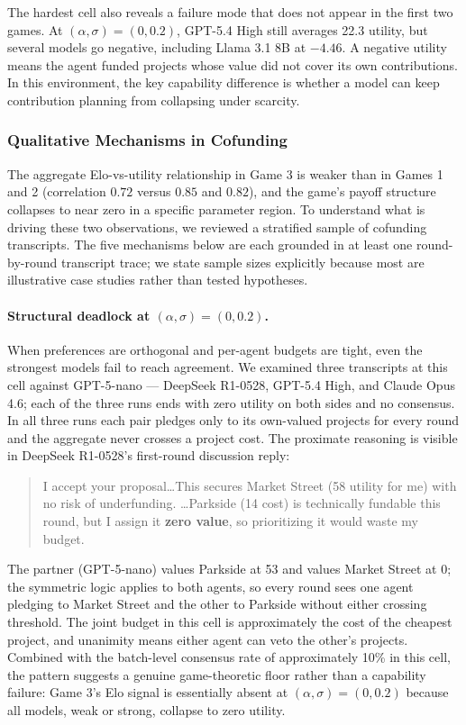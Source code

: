 The hardest cell also reveals a failure mode that does not appear in the first two games. At $(\alpha, \sigma) = (0, 0.2)$, GPT-5.4 High still averages 22.3 utility, but several models go negative, including Llama 3.1 8B at $-4.46$. A negative utility means the agent funded projects whose value did not cover its own contributions. In this environment, the key capability difference is whether a model can keep contribution planning from collapsing under scarcity.

\subsubsection{Qualitative Mechanisms in Cofunding}
\label{sec:game3_qualitative}

The aggregate Elo-vs-utility relationship in Game 3 is weaker than in Games 1 and 2 (correlation $0.72$ versus $0.85$ and $0.82$), and the game's payoff structure collapses to near zero in a specific parameter region. To understand what is driving these two observations, we reviewed a stratified sample of cofunding transcripts. The five mechanisms below are each grounded in at least one round-by-round transcript trace; we state sample sizes explicitly because most are illustrative case studies rather than tested hypotheses.

\paragraph{Structural deadlock at $(\alpha, \sigma) = (0, 0.2)$.} When preferences are orthogonal and per-agent budgets are tight, even the strongest models fail to reach agreement. We examined three transcripts at this cell against GPT-5-nano --- DeepSeek R1-0528, GPT-5.4 High, and Claude Opus 4.6; each of the three runs ends with zero utility on both sides and no consensus. In all three runs each pair pledges only to its own-valued projects for every round and the aggregate never crosses a project cost. The proximate reasoning is visible in DeepSeek R1-0528's first-round discussion reply:
\begin{quote}
I accept your proposal\ldots This secures Market Street (58 utility for me) with no risk of underfunding. \ldots Parkside (14 cost) is technically fundable this round, but I assign it \textbf{zero value}, so prioritizing it would waste my budget.
\end{quote}
The partner (GPT-5-nano) values Parkside at 53 and values Market Street at 0; the symmetric logic applies to both agents, so every round sees one agent pledging to Market Street and the other to Parkside without either crossing threshold. The joint budget in this cell is approximately the cost of the cheapest project, and unanimity means either agent can veto the other's projects. Combined with the batch-level consensus rate of approximately 10\% in this cell, the pattern suggests a genuine game-theoretic floor rather than a capability failure: Game 3's Elo signal is essentially absent at $(\alpha, \sigma) = (0, 0.2)$ because all models, weak or strong, collapse to zero utility.

